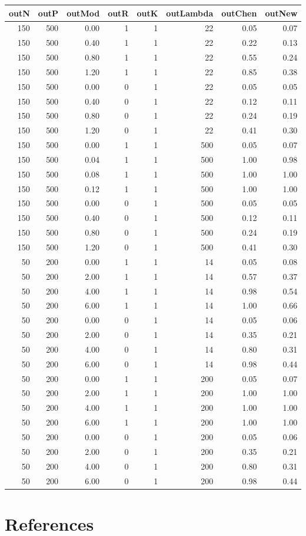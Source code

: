 \documentclass[review]{elsarticle}
\theoremstyle{plain}
\theoremstyle{definition}
\theoremstyle{remark}
\begin{document}
\begin{table}[ht]
\centering
\begin{tabular}{rrrrrrrr}
  \hline
outN & outP & outMod & outR & outK & outLambda & outChen & outNew \\ 
  \hline
150 & 500 & 0.00 & 1 & 1 & 22 & 0.05 & 0.07 \\ 
  150 & 500 & 0.40 & 1 & 1 & 22 & 0.22 & 0.13 \\ 
  150 & 500 & 0.80 & 1 & 1 & 22 & 0.55 & 0.24 \\ 
  150 & 500 & 1.20 & 1 & 1 & 22 & 0.85 & 0.38 \\ 
  150 & 500 & 0.00 & 0 & 1 & 22 & 0.05 & 0.05 \\ 
  150 & 500 & 0.40 & 0 & 1 & 22 & 0.12 & 0.11 \\ 
  150 & 500 & 0.80 & 0 & 1 & 22 & 0.24 & 0.19 \\ 
  150 & 500 & 1.20 & 0 & 1 & 22 & 0.41 & 0.30 \\ 
  150 & 500 & 0.00 & 1 & 1 & 500 & 0.05 & 0.07 \\ 
  150 & 500 & 0.04 & 1 & 1 & 500 & 1.00 & 0.98 \\ 
  150 & 500 & 0.08 & 1 & 1 & 500 & 1.00 & 1.00 \\ 
  150 & 500 & 0.12 & 1 & 1 & 500 & 1.00 & 1.00 \\ 
  150 & 500 & 0.00 & 0 & 1 & 500 & 0.05 & 0.05 \\ 
  150 & 500 & 0.40 & 0 & 1 & 500 & 0.12 & 0.11 \\ 
  150 & 500 & 0.80 & 0 & 1 & 500 & 0.24 & 0.19 \\ 
  150 & 500 & 1.20 & 0 & 1 & 500 & 0.41 & 0.30 \\ 
  50 & 200 & 0.00 & 1 & 1 & 14 & 0.05 & 0.08 \\ 
  50 & 200 & 2.00 & 1 & 1 & 14 & 0.57 & 0.37 \\ 
  50 & 200 & 4.00 & 1 & 1 & 14 & 0.98 & 0.54 \\ 
  50 & 200 & 6.00 & 1 & 1 & 14 & 1.00 & 0.66 \\ 
  50 & 200 & 0.00 & 0 & 1 & 14 & 0.05 & 0.06 \\ 
  50 & 200 & 2.00 & 0 & 1 & 14 & 0.35 & 0.21 \\ 
  50 & 200 & 4.00 & 0 & 1 & 14 & 0.80 & 0.31 \\ 
  50 & 200 & 6.00 & 0 & 1 & 14 & 0.98 & 0.44 \\ 
  50 & 200 & 0.00 & 1 & 1 & 200 & 0.05 & 0.07 \\ 
  50 & 200 & 2.00 & 1 & 1 & 200 & 1.00 & 1.00 \\ 
  50 & 200 & 4.00 & 1 & 1 & 200 & 1.00 & 1.00 \\ 
  50 & 200 & 6.00 & 1 & 1 & 200 & 1.00 & 1.00 \\ 
  50 & 200 & 0.00 & 0 & 1 & 200 & 0.05 & 0.06 \\ 
  50 & 200 & 2.00 & 0 & 1 & 200 & 0.35 & 0.21 \\ 
  50 & 200 & 4.00 & 0 & 1 & 200 & 0.80 & 0.31 \\ 
  50 & 200 & 6.00 & 0 & 1 & 200 & 0.98 & 0.44 \\ 
   \hline
\end{tabular}
\end{table}


\section*{References}

\end{document}
